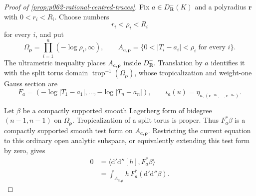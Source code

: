 
\begin{proof}[Proof of \cref{prop:p062-rational-centred-traces}]
Fix \(a\in D^-_{\mathbf R}(K)\) and a polyradius
\(\mathbf r\) with \(0<r_i<R_i\).  Choose numbers
\begin{equation}\label{eq:p062-rho-above-r}
                         r_i<\rho_i<R_i
\end{equation}
for every \(i\), and put
\[
 \Omega_{\boldsymbol\rho}
   =\prod_{i=1}^n(-\log\rho_i,\infty),
 \qquad
 A_{a,\boldsymbol\rho}
   =\{0<|T_i-a_i|<\rho_i\text{ for every }i\}.
\]
The ultrametric inequality places \(A_{a,\boldsymbol\rho}\) inside
\(D^-_{\mathbf R}\).  Translation by \(a\) identifies it with the split
torus domain
\(\operatorname{trop}^{-1}(\Omega_{\boldsymbol\rho})\), whose
tropicalization and weight-one Gauss section are
\[
 F_a=(-\log|T_1-a_1|,\ldots,-\log|T_n-a_n|),
 \qquad
 \iota_a(u)=\eta_{a,(\mathrm e^{-u_1},\ldots,\mathrm e^{-u_n})}.
\]

Let \(\beta\) be a compactly supported smooth Lagerberg form of
bidegree \((n-1,n-1)\) on \(\Omega_{\boldsymbol\rho}\).  Tropicalization
of a split torus is proper.  Thus \(F_a^*\beta\) is a compactly supported
smooth test form on \(A_{a,\boldsymbol\rho}\).  Restricting the current
equation to this ordinary open analytic subspace, or equivalently
extending this test form by zero, gives
\begin{equation}\label{eq:p062-arbitrary-field-test-identity}
 \begin{aligned}
 0
 &=\bigl\langle\mathrm d'\mathrm d''[h],F_a^*\beta\bigr\rangle\\
 &=\int_{A_{a,\boldsymbol\rho}}
             h\,F_a^*(\mathrm d'\mathrm d''\beta).
 \end{aligned}
\end{equation}


\end{proof}
